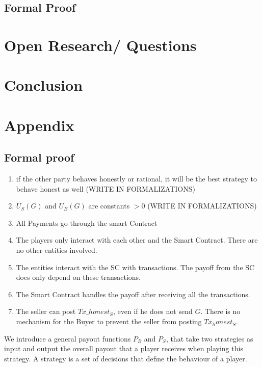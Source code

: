 \documentclass{cacthesis}
\begin{document}
\section{Formal Proof}


\chapter{Open Research/ Questions}

\chapter{Conclusion}

\chapter{Appendix}

\section{Formal proof}
\begin{enumerate}
    \item if the other party behaves honestly or rational, it will be the best strategy to behave honest as well (WRITE IN FORMALIZATIONS)
    \item $U_S(G)$ and $U_B(G)$ are constants $> 0$ (WRITE IN FORMALIZATIONS)
    \item All Payments go through the smart Contract
    \item The players only interact with each other and the Smart Contract. There are no other entities involved.
    \item The entities interact with the SC with transactions. The payoff from the SC does only depend on these transactions.
    \item The Smart Contract handles the payoff after receiving all the transactions.
    \item The seller can post $Tx\_honest_S$, even if he does not send $G$. There is no mechanism for the Buyer to prevent the seller from posting $Tx_honest_S$.

\end{enumerate}


We introduce a general payout functions $P_B$ and $P_S$, that take two strategies as input and output the overall payout that a player receives when playing this strategy.\newline
A strategy is a set of decisions that define the behaviour of a player. %
\end{document}
